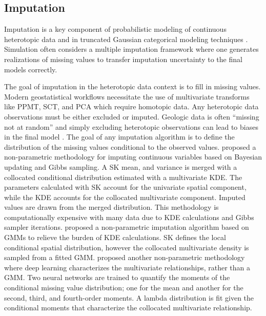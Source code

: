 \FloatBarrier
\subsection{Imputation}
\label{subsec:01impute}

Imputation is a key component of probabilistic modeling of continuous heterotopic data \citep{barnett2015multivariate,silva2018multivariate,hadavand2023spatial} and in truncated Gaussian categorical modeling techniques \citep{silva2018enhanced,arroyo2020iterative,madani2021enhanced,armstrong2011plurigaussian}. Simulation often considers a multiple imputation framework \citep{little2019statistical} where one generates realizations of missing values to transfer imputation uncertainty to the final models correctly.

The goal of imputation in the heterotopic data context is to fill in missing values. Modern geostatistical workflows necessitate the use of multivariate transforms like \gls{PPMT}, \gls{SCT}, and \gls{PCA} which require homotopic data. Any heterotopic data observations must be either excluded or imputed. Geologic data is often ``missing not at random'' and simply excluding heterotopic observations can lead to biases in the final model \citep{dasilva2019treatment}. The goal of any imputation algorithm is to define the distribution of the missing values conditional to the observed values. \cite{barnett2015multivariate} proposed a non-parametric methodology for imputing continuous variables based on Bayesian updating and Gibbs sampling. A \gls{SK} mean, and variance is merged with a collocated conditional distribution estimated with a multivariate \gls{KDE}. The parameters calculated with \gls{SK} account for the univariate spatial component, while the \gls{KDE} accounts for the collocated multivariate component. Imputed values are drawn from the merged distribution. This methodology is computationally expensive with many data due to \gls{KDE} calculations and Gibbs sampler iterations. \cite{silva2018multivariate} proposed a non-parametric imputation algorithm based on \glspl{GMM} to relieve the burden of \gls{KDE} calculations. \Gls{SK} defines the local conditional spatial distribution, however the collocated multivariate density is sampled from a fitted \gls{GMM}. \cite{hadavand2023spatial} proposed another non-parametric methodology where deep learning characterizes the multivariate relationships, rather than a \gls{GMM}. Two neural networks are trained to quantify the moments of the conditional missing value distribution; one for the mean and another for the second, third, and fourth-order moments. A lambda distribution is fit given the conditional moments that characterize the collocated multivariate relationship.


